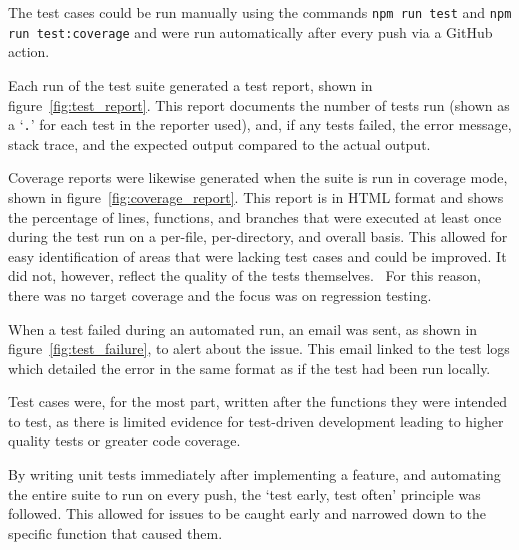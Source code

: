 The test cases could be run manually using the commands \texttt{npm run test} and \texttt{npm run test:coverage}
and were run automatically after every push via a GitHub action.

Each run of the test suite generated a test report, shown in figure~\ref{fig:test_report}. This report
documents the number of tests run (shown as a \enquote*{\texttt{.}} for each test in the reporter used),
and, if any tests failed, the error message, stack trace, and the expected output compared to the actual output.

Coverage reports were likewise generated when the suite is run in coverage mode, shown in figure~\ref{fig:coverage_report}.
This report is in HTML format and shows the percentage of lines, functions, and branches that were executed at least once
during the test run on a per-file, per-directory, and overall basis. This allowed for easy identification of areas that
were lacking test cases and could be improved. It did not, however, reflect the quality of the tests themselves.~\cite{meyer_is_2012}
For this reason, there was no target coverage and the focus was on regression testing.

When a test failed during an automated run, an email was sent, as shown in figure~\ref{fig:test_failure}, to alert
about the issue. This email linked to the test logs which detailed the error in the same format as if the test had been run
locally.

Test cases were, for the most part, written after the functions they were intended to test,
as there is limited evidence for test-driven development leading to higher
quality tests or greater code coverage.~\cite{tosun_effectiveness_2018,madeyski_impact_2010}

By writing unit tests immediately after implementing a feature, and automating the entire suite to run
on every push, the \enquote*{test early, test often} principle was followed. This allowed for
issues to be caught early and narrowed down to the specific function that caused them.~\cite{olan_unit_2003}

